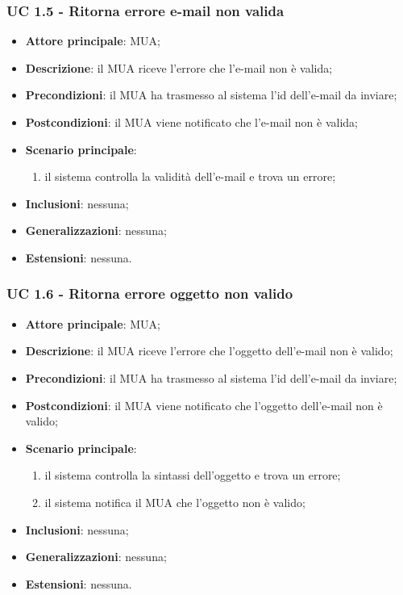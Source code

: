     \subsubsection{UC 1.5 - Ritorna errore e-mail non valida} \label{sec:UC1.5}
    \begin{itemize}
        \item \textbf{Attore principale}: MUA;
        \item \textbf{Descrizione}: il MUA riceve l'errore che l'e-mail non è valida;
        \item \textbf{Precondizioni}: il MUA ha trasmesso al sistema l'id dell'e-mail da inviare;
        \item \textbf{Postcondizioni}: il MUA viene notificato che l'e-mail non è valida;
        \item \textbf{Scenario principale}:
            \begin{enumerate}
                \item il sistema controlla la validità dell'e-mail e trova un errore;
            \end{enumerate}
        \item \textbf{Inclusioni}: nessuna;
        \item \textbf{Generalizzazioni}: nessuna;
        \item \textbf{Estensioni}: nessuna.
    \end{itemize}

    \subsubsection{UC 1.6 - Ritorna errore oggetto non valido} \label{sec:UC1.6}
    \begin{itemize}
        \item \textbf{Attore principale}: MUA;
        \item \textbf{Descrizione}: il MUA riceve l'errore che l'oggetto dell'e-mail non è valido;
        \item \textbf{Precondizioni}: il MUA ha trasmesso al sistema l'id dell'e-mail da inviare;
        \item \textbf{Postcondizioni}: il MUA viene notificato che l'oggetto dell'e-mail non è valido;
        \item \textbf{Scenario principale}:
            \begin{enumerate}
                \item il sistema controlla la sintassi dell'oggetto e trova un errore;
                \item il sistema notifica il MUA che l'oggetto non è valido;
            \end{enumerate}
        \item \textbf{Inclusioni}: nessuna;
        \item \textbf{Generalizzazioni}: nessuna;
        \item \textbf{Estensioni}: nessuna.
    \end{itemize}

